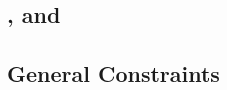 \subsection{\lc{}, \lx{} and \lt{}}                  \label{rlp txn v2: generalities: lc lx and lt}                   
\subsection{General Constraints}                     \label{rlp txn v2: generalities: general constraints}            

